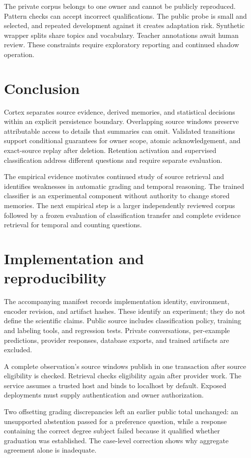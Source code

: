 \documentclass[11pt]{article}
\begin{document}
The private corpus belongs to one owner and cannot be publicly reproduced. Pattern checks can accept incorrect qualifications. The public probe is small and selected, and repeated development against it creates adaptation risk. Synthetic wrapper splits share topics and vocabulary. Teacher annotations await human review. These constraints require exploratory reporting and continued shadow operation.

\section{Conclusion}
Cortex separates source evidence, derived memories, and statistical decisions within an explicit persistence boundary. Overlapping source windows preserve attributable access to details that summaries can omit. Validated transitions support conditional guarantees for owner scope, atomic acknowledgement, and exact-source replay after deletion. Retention activation and supervised classification address different questions and require separate evaluation.

The empirical evidence motivates continued study of source retrieval and identifies weaknesses in automatic grading and temporal reasoning. The trained classifier is an experimental component without authority to change stored memories. The next empirical step is a larger independently reviewed corpus followed by a frozen evaluation of classification transfer and complete evidence retrieval for temporal and counting questions.

\appendix
\section{Implementation and reproducibility}
The accompanying manifest records implementation identity, environment, encoder revision, and artifact hashes. These identify an experiment; they do not define the scientific claims. Public source includes classification policy, training and labeling tools, and regression tests. Private conversations, per-example predictions, provider responses, database exports, and trained artifacts are excluded.

A complete observation's source windows publish in one transaction after source eligibility is checked. Retrieval checks eligibility again after provider work. The service assumes a trusted host and binds to localhost by default. Exposed deployments must supply authentication and owner authorization.

Two offsetting grading discrepancies left an earlier public total unchanged: an unsupported abstention passed for a preference question, while a response containing the correct degree subject failed because it qualified whether graduation was established. The case-level correction shows why aggregate agreement alone is inadequate.



\end{document}
